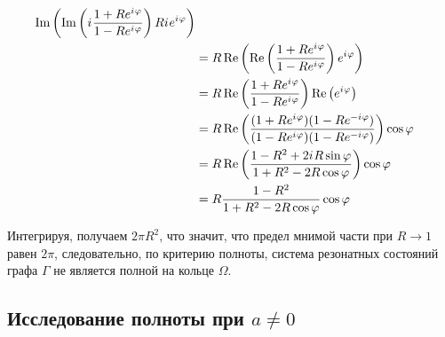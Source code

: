 \begin{align*}
   \operatorname{Im} \left(  \operatorname{Im} \left( {i\mkern1mu} \frac{1 + R e^{{i\mkern1mu} \varphi}}{1 - R e^{{i\mkern1mu} \varphi}} \right) R {i\mkern1mu} e^{{i\mkern1mu} \varphi} \right)
\\ &= R \operatorname{Re} \left(  \operatorname{Re} \left( \frac{1 + R e^{{i\mkern1mu} \varphi}}{1 - R e^{{i\mkern1mu} \varphi}} \right) e^{{i\mkern1mu} \varphi} \right)
\\ &= R \operatorname{Re} \left( \frac{1 + R e^{{i\mkern1mu} \varphi}}{1 - R e^{{i\mkern1mu} \varphi}} \right) \operatorname{Re} \left(   e^{{i\mkern1mu} \varphi} \right)
\\ &= R \operatorname{Re} \left( \frac{(1 + R e^{{i\mkern1mu} \varphi}) (1 - R e^{-{i\mkern1mu} \varphi}) }{(1 - R e^{{i\mkern1mu} \varphi}) (1 - R e^{-{i\mkern1mu} \varphi})} \right) \cos \varphi
\\ &= R \operatorname{Re} \left( \frac{1 - R^2 + 2 {i\mkern1mu} R \sin \varphi}{1 + R^2 - 2 R \cos \varphi} \right) \cos \varphi
\\ &= R \frac{1 - R^2}{1 + R^2 - 2 R \cos \varphi} \cos \varphi 
\end{align*}


Интегрируя, получаем $2 \pi R^2$, что значит, что предел мнимой части при $R \to 1$ равен $2 \pi$, следовательно, по критерию полноты, система резонатных состояний графа $\Gamma$ не является полной на кольце $\Omega$.



\subsection{Исследование полноты при $a \ne 0$}


